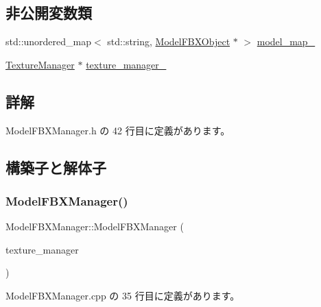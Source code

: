 \subsection*{非公開変数類}
\begin{DoxyCompactItemize}
\item 
std\+::unordered\+\_\+map$<$ std\+::string, \mbox{\hyperlink{class_model_f_b_x_object}{Model\+F\+B\+X\+Object}} $\ast$ $>$ \mbox{\hyperlink{class_model_f_b_x_manager_adac581d36a055c584179261b328d1909}{model\+\_\+map\+\_\+}}
\item 
\mbox{\hyperlink{class_texture_manager}{Texture\+Manager}} $\ast$ \mbox{\hyperlink{class_model_f_b_x_manager_ab44f914c3afd05163a190a55022e3f7b}{texture\+\_\+manager\+\_\+}}
\end{DoxyCompactItemize}


\subsection{詳解}


 Model\+F\+B\+X\+Manager.\+h の 42 行目に定義があります。



\subsection{構築子と解体子}
\mbox{\label{class_model_f_b_x_manager_a56089e9327a1739e3b88dada724bd898}} 
\subsubsection{\texorpdfstring{Model\+F\+B\+X\+Manager()}{ModelFBXManager()}}
{\footnotesize\ttfamily Model\+F\+B\+X\+Manager\+::\+Model\+F\+B\+X\+Manager (\begin{DoxyParamCaption}\item[{\mbox{\hyperlink{class_texture_manager}{Texture\+Manager}} $\ast$}]{texture\+\_\+manager }\end{DoxyParamCaption})}



 Model\+F\+B\+X\+Manager.\+cpp の 35 行目に定義があります。

\mbox{\label{class_model_f_b_x_manager_a6714c69d45e3aad2d0d04b0d1a69d2dc}} 
